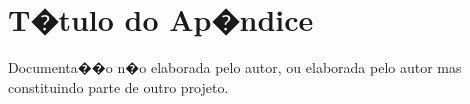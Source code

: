 \section{T�tulo do Ap�ndice}

Documenta��o n�o elaborada pelo autor, ou elaborada pelo autor mas constituindo parte de outro projeto.